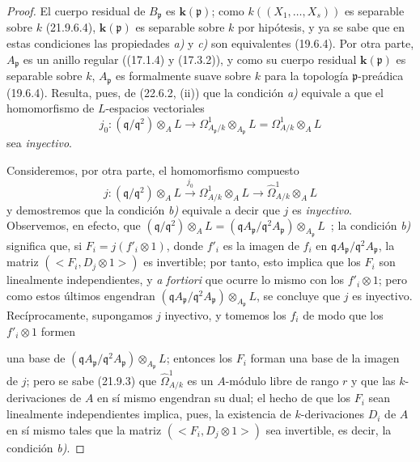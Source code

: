 \begin{proof}
El cuerpo residual de $B_{\mathfrak p}$ es $\boldsymbol{k}(\mathfrak p)$; como
$k((X_1,\ldots,X_s))$ es separable sobre $k$ (21.9.6.4), $\boldsymbol{k}(\mathfrak p)$ es
separable sobre $k$ por hipótesis, y ya se sabe que en estas condiciones las
propiedades \emph{a)} y \emph{c)} son equivalentes (19.6.4). Por otra parte,
$A_{\mathfrak p}$ es un anillo regular ((17.1.4) y (17.3.2)), y como su
cuerpo residual $\boldsymbol{k}(\mathfrak p)$ es separable sobre $k$, $A_{\mathfrak p}$ es
formalmente suave sobre $k$ para la topología $\mathfrak p$-preádica
(19.6.4). Resulta, pues, de (22.6.2, (ii)) que la condición \emph{a)} equivale a que
el homomorfismo de $L$-espacios vectoriales
\begin{equation}
\label{0.22.7.2.1-fr}
  j_0:(\mathfrak q/\mathfrak q^2)\otimes_AL
  \longrightarrow\Omega^1_{A_{\mathfrak p}/k}\otimes_{A_{\mathfrak p}}L
  =\Omega^1_{A/k}\otimes_AL
  \tag{22.7.2.1}
\end{equation}
sea \emph{inyectivo}.

Consideremos, por otra parte, el homomorfismo compuesto
\begin{equation}
\label{0.22.7.2.2-fr}
  j:(\mathfrak q/\mathfrak q^2)\otimes_AL
  \xrightarrow{j_0}\Omega^1_{A/k}\otimes_AL
  \longrightarrow\widehat\Omega^1_{A/k}\otimes_AL
  \tag{22.7.2.2}
\end{equation}
y demostremos que la condición \emph{b)} equivale a decir que $j$ es \emph{inyectivo}. Observemos, en
efecto, que
$(\mathfrak q/\mathfrak q^2)\otimes_AL
=(\mathfrak qA_{\mathfrak p}/\mathfrak q^2A_{\mathfrak p})
\otimes_{A_{\mathfrak p}}L$~;
la condición \emph{b)} significa que, si $F_i=j(f'_i\otimes1)$, donde $f'_i$ es la imagen
de $f_i$ en
$\mathfrak qA_{\mathfrak p}/\mathfrak q^2A_{\mathfrak p}$, la matriz
$(\mathopen{<}F_i,D_j\otimes1\mathclose{>})$ es invertible; por tanto, esto implica que los
$F_i$ son linealmente independientes, y \emph{a fortiori} que ocurre lo
mismo con los $f'_i\otimes1$; pero como estos últimos engendran
$(\mathfrak qA_{\mathfrak p}/\mathfrak q^2A_{\mathfrak p})
\otimes_{A_{\mathfrak p}}L$, se concluye que $j$ es inyectivo. Recíprocamente,
supongamos $j$ inyectivo, y tomemos los $f_i$ de modo que los $f'_i\otimes1$
formen


una base de
$(\mathfrak qA_{\mathfrak p}/\mathfrak q^2A_{\mathfrak p})
\otimes_{A_{\mathfrak p}}L$; entonces los $F_i$ forman una base de la imagen de
$j$; pero se sabe (21.9.3) que $\widehat\Omega^1_{A/k}$ es un $A$-módulo
libre de rango $r$ y que las $k$-derivaciones de $A$ en sí mismo engendran su
dual; el hecho de que los $F_i$ sean linealmente independientes implica, pues,
la existencia de $k$-derivaciones $D_i$ de $A$ en sí mismo tales que la matriz
$(\mathopen{<}F_i,D_j\otimes1\mathclose{>})$ sea invertible, es decir, la condición
\emph{b)}.


\end{proof}
